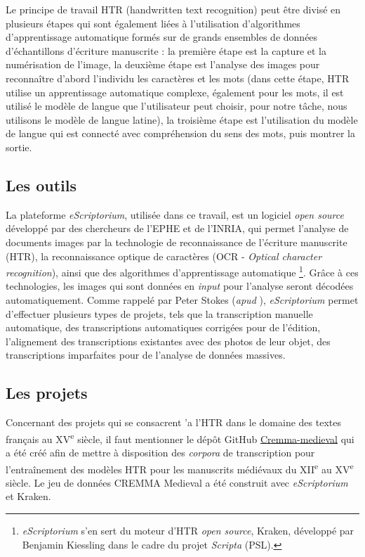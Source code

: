 \documentclass{article}
\begin{document}
Le principe de travail HTR  (handwritten text recognition) peut être divisé en plusieurs étapes qui sont également liées à l'utilisation d'algorithmes d'apprentissage automatique formés sur de grands ensembles de données d'échantillons d'écriture manuscrite : la première étape est la capture et la numérisation de l'image, la deuxième étape est l'analyse des images pour reconnaître d'abord l'individu les caractères et les mots (dans cette étape, HTR utilise un apprentissage automatique complexe, également pour les mots, il est utilisé le modèle de langue que l'utilisateur peut choisir, pour notre tâche, nous utilisons le modèle de langue latine), la troisième étape est l'utilisation du modèle de langue qui est connecté avec compréhension du sens des mots, puis montrer la sortie. 


\subsection{Les outils}
La plateforme \emph{eScriptorium}, utilisée dans ce travail, est un logiciel \emph{open source} développé par des chercheurs de l’EPHE et de l’INRIA, qui permet l'analyse de documents images par la technologie de reconnaissance de l'écriture manuscrite (HTR), la reconnaissance optique de caractères (OCR - \emph{Optical character recognition}), ainsi que des algorithmes d'apprentissage automatique \footnote{\emph{eScriptorium} s’en sert du moteur d’HTR \emph{open source}, Kraken, développé par Benjamin Kiessling dans le cadre du projet \emph{Scripta} (PSL).}. Grâce à ces technologies, les images qui sont données en \emph{input} pour l’analyse seront décodées automatiquement. Comme rappelé par Peter Stokes (\emph{apud} \cite{gautier_compte-rendu_nodate}), \emph{eScriptorium} permet d’effectuer plusieurs types de projets, tels que la transcription manuelle automatique, des transcriptions automatiques corrigées pour de l’édition, l’alignement des transcriptions existantes avec des photos de leur objet, des transcriptions imparfaites pour de l’analyse de données massives.

\subsection{Les projets}
Concernant des projets qui se consacrent 'a l'HTR dans le domaine des textes français au XV\textsuperscript{e} siècle, il faut mentionner 
le dépôt GitHub  \href{https://github.com/ HTR-Uni/cremma-médiéval} {Cremma-medieval} qui a été créé afin de mettre à disposition des \emph{corpora} de transcription pour l'entraînement des modèles HTR pour les manuscrits médiévaux du XII\textsuperscript{e} au XV\textsuperscript{e} siècle. Le jeu de données CREMMA Medieval a été construit avec \emph{eScriptorium} et Kraken.
\end{document}
